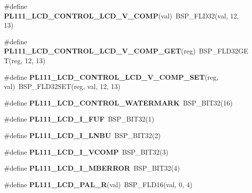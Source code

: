 \begin{DoxyCompactItemize}
\#define {\bfseries P\+L111\+\_\+\+L\+C\+D\+\_\+\+C\+O\+N\+T\+R\+O\+L\+\_\+\+L\+C\+D\+\_\+\+V\+\_\+\+C\+O\+MP}(val)~B\+S\+P\+\_\+\+F\+L\+D32(val, 12, 13)
\item 
\mbox{\label{arm-pl111-regs_8h_a61e890361775b24d3ea758c3a647b255}} 
\#define {\bfseries P\+L111\+\_\+\+L\+C\+D\+\_\+\+C\+O\+N\+T\+R\+O\+L\+\_\+\+L\+C\+D\+\_\+\+V\+\_\+\+C\+O\+M\+P\+\_\+\+G\+ET}(reg)~B\+S\+P\+\_\+\+F\+L\+D32\+G\+ET(reg, 12, 13)
\item 
\mbox{\label{arm-pl111-regs_8h_ac5d4df8a4fbe8e132c1ae8bc2ec344a6}} 
\#define {\bfseries P\+L111\+\_\+\+L\+C\+D\+\_\+\+C\+O\+N\+T\+R\+O\+L\+\_\+\+L\+C\+D\+\_\+\+V\+\_\+\+C\+O\+M\+P\+\_\+\+S\+ET}(reg,  val)~B\+S\+P\+\_\+\+F\+L\+D32\+S\+ET(reg, val, 12, 13)
\item 
\mbox{\label{arm-pl111-regs_8h_af4c18906adec56047aac538dbd50fa2d}} 
\#define {\bfseries P\+L111\+\_\+\+L\+C\+D\+\_\+\+C\+O\+N\+T\+R\+O\+L\+\_\+\+W\+A\+T\+E\+R\+M\+A\+RK}~B\+S\+P\+\_\+\+B\+I\+T32(16)
\item 
\mbox{\label{arm-pl111-regs_8h_a0f37042d5fa2f507d77f8823e86fee14}} 
\#define {\bfseries P\+L111\+\_\+\+L\+C\+D\+\_\+\+I\+\_\+\+F\+UF}~B\+S\+P\+\_\+\+B\+I\+T32(1)
\item 
\mbox{\label{arm-pl111-regs_8h_a80a6921471cc759911f5b242779f6b34}} 
\#define {\bfseries P\+L111\+\_\+\+L\+C\+D\+\_\+\+I\+\_\+\+L\+N\+BU}~B\+S\+P\+\_\+\+B\+I\+T32(2)
\item 
\mbox{\label{arm-pl111-regs_8h_a26eda9fab378b90d7984c70ba6637873}} 
\#define {\bfseries P\+L111\+\_\+\+L\+C\+D\+\_\+\+I\+\_\+\+V\+C\+O\+MP}~B\+S\+P\+\_\+\+B\+I\+T32(3)
\item 
\mbox{\label{arm-pl111-regs_8h_a8bdc4af0f3f5c060d399c103ce1be907}} 
\#define {\bfseries P\+L111\+\_\+\+L\+C\+D\+\_\+\+I\+\_\+\+M\+B\+E\+R\+R\+OR}~B\+S\+P\+\_\+\+B\+I\+T32(4)
\item 
\mbox{\label{arm-pl111-regs_8h_a31f15791c7f5defbf9b241eeabab9ec6}} 
\#define {\bfseries P\+L111\+\_\+\+L\+C\+D\+\_\+\+P\+A\+L\+\_\+R}(val)~B\+S\+P\+\_\+\+F\+L\+D16(val, 0, 4)
\item 

\end{DoxyCompactItemize}
